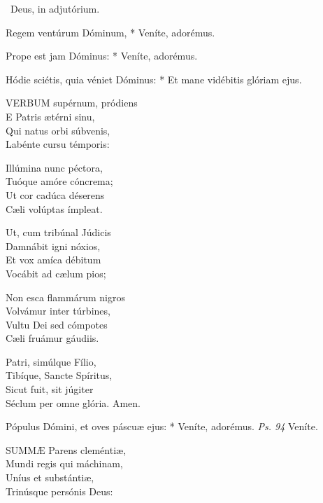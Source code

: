 \V\ Deus, in adjutórium.



 Regem ventúrum Dóminum, * Veníte, adorémus.


 Prope est jam Dóminus: * Veníte, adorémus.


 Hódie sciétis, quia véniet Dóminus: * Et mane vidébitis glóriam ejus.


\lettrine[lines=2]{V}{ERBUM} supérnum, pródiens\\
E Patris ætérni sinu,\\
Qui natus orbi súbvenis,\\
Labénte cursu témporis:

Illúmina nunc péctora,\\
Tuóque amóre cóncrema;\\
Ut cor cadúca déserens\\
Cæli volúptas ímpleat.

Ut, cum tribúnal Júdicis\\
Damnábit igni nóxios,\\
Et vox amíca débitum\\
Vocábit ad cælum pios;

Non esca flammárum nigros\\
Volvámur inter túrbines,\\
Vultu Dei sed cómpotes\\
Cæli fruámur gáudiis.

Patri, simúlque Fílio,\\
Tibíque, Sancte Spíritus,\\
Sicut fuit, sit júgiter\\
Séclum per omne glória. Amen.



 Pópulus Dómini, et oves páscuæ ejus: * Veníte, adorémus. \textit{Ps. 94} Veníte.


\lettrine[lines=2]{S}{UMMÆ} Parens cleméntiæ,\\
Mundi regis qui máchinam,\\
Uníus et substántiæ,\\
Trinúsque persónis Deus:

